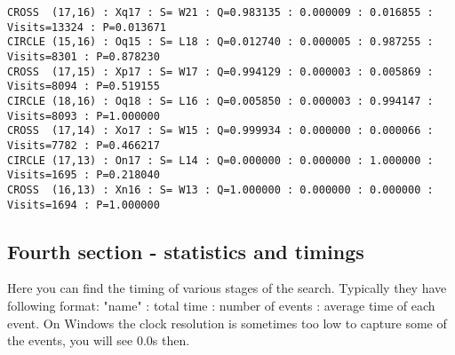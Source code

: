 \documentclass[12pt,a4paper]{article}
\begin{document}
\begin{scriptsize}
\begin{verbatim}
CROSS  (17,16) : Xq17 : S= W21 : Q=0.983135 : 0.000009 : 0.016855 : Visits=13324 : P=0.013671
CIRCLE (15,16) : Oq15 : S= L18 : Q=0.012740 : 0.000005 : 0.987255 : Visits=8301 : P=0.878230
CROSS  (17,15) : Xp17 : S= W17 : Q=0.994129 : 0.000003 : 0.005869 : Visits=8094 : P=0.519155
CIRCLE (18,16) : Oq18 : S= L16 : Q=0.005850 : 0.000003 : 0.994147 : Visits=8093 : P=1.000000
CROSS  (17,14) : Xo17 : S= W15 : Q=0.999934 : 0.000000 : 0.000066 : Visits=7782 : P=0.466217
CIRCLE (17,13) : On17 : S= L14 : Q=0.000000 : 0.000000 : 1.000000 : Visits=1695 : P=0.218040
CROSS  (16,13) : Xn16 : S= W13 : Q=1.000000 : 0.000000 : 0.000000 : Visits=1694 : P=1.000000
\end{verbatim}
\end{scriptsize}

\subsection{Fourth section - statistics and timings}
Here you can find the timing of various stages of the search. Typically they have following format: "name" : total time : number of events : average time of each event. On Windows the clock resolution is sometimes too low to capture some of the events, you will see 0.0s then.
\end{document}
